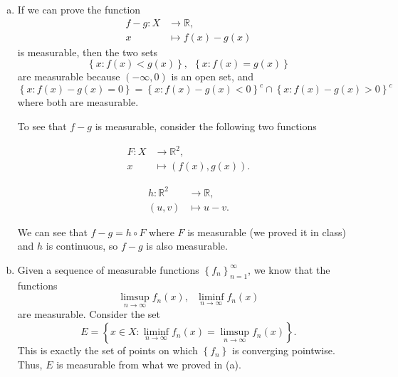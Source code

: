 \documentclass[letterpaper, 12pt]{article}
\begin{document}
\begin{solution}
\begin{enumerate}[(a)]
  \item If we can prove the function 
\begin{align*}
     f-g:X&\rightarrow \mathbb{R},\\ 
         x&\mapsto f(x)-g(x) 
\end{align*}
is measurable, then the two sets
\[\left\{ x:f(x)<g(x) \right\},\ \ \left\{ x:f(x)=g(x) \right\}\]
are measurable because \((-\infty,0)\) is an open set, and 
\[\left\{ x:f(x)-g(x)=0 \right\}=\left\{ x:f(x)-g(x)<0 \right\}^c\cap \left\{ x:f(x)-g(x)>0 \right\}^c\]
where both are measurable. 

To see that \(f-g\) is measurable, consider the following two functions 

\noindent
\begin{minipage}[t]{.48\textwidth}
  \begin{align*}
    F: X& \rightarrow \mathbb{R}^2, \\
    x &\mapsto (f(x),g(x)).
  \end{align*}
\end{minipage}\hfill
\begin{minipage}[t]{.48\textwidth}
  \begin{align*}
    h: \mathbb{R}^2 &\rightarrow \mathbb{R}, \\
    (u,v) &\mapsto u-v.
  \end{align*}
\end{minipage}

\vspace{.3cm}

We can see that \(f-g=h\circ F\) where \(F\) is measurable (we proved it in class) and \(h\) is continuous, so \(f-g\) is also measurable.
\item Given a sequence of measurable functions \(\left\{ f_n \right\}_{n=1}^\infty\), we know that the functions
\[\limsup_{n\to \infty} f_n(x),\ \ \  \liminf_{n\to \infty}f_n(x)\]
are measurable. Consider the set 
\[E=\left\{ x\in X:\liminf_{n\to \infty}f_n(x)=\limsup_{n\to \infty}f_n(x) \right\}.\]
This is exactly the set of points on which \(\left\{ f_n \right\}\) is converging pointwise. Thus, \(E\) is measurable from what we proved in (a).
\end{enumerate}
\end{solution}
\end{document}
